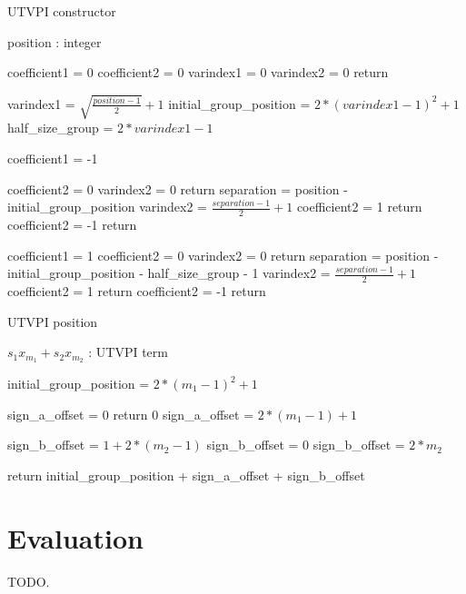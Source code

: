 \begin{algorithm}
  \caption{UTVPI constructor}
  \linespread{\separationline}\selectfont
  \begin{algorithmic}[2]
     {position : integer}

    \State coefficient1 = 0
    \State coefficient2 = 0
    \State varindex1 = 0
    \State varindex2 = 0
    \State return
    \EndIf

    \State varindex1 = $\sqrt{\frac{position - 1}{2}} + 1$
    \State initial\_group\_position = $2*(varindex1-1)^2 + 1$
    \State half\_size\_group = $2*varindex1-1$

    \State coefficient1 = -1

    \State coefficient2 = 0
    \State varindex2 = 0
    \State return
    \EndIf
    \State separation = position - initial\_group\_position
    \State varindex2 = $\frac{separation - 1}{2} + 1$
    \State coefficient2 = 1
    \State return
    \EndIf
    \State coefficient2 = -1
    \State return
    \EndIf

    \State coefficient1 = 1
    \State coefficient2 = 0
    \State varindex2 = 0
    \State return
    \EndIf
    \State separation = position - initial\_group\_position - half\_size\_group - 1
    \State varindex2 = $\frac{separation - 1}{2} + 1$
    \State coefficient2 = 1
    \State return
    \EndIf
    \State coefficient2 = -1
    \State return
    \EndProcedure
  \end{algorithmic}
\end{algorithm}

\begin{algorithm}
  \caption{UTVPI position}
  \linespread{\separationline}\selectfont
  \begin{algorithmic}[2]
     { $s_1 x_{m_1} + s_2 x_{m_2}$ : UTVPI term}

    \State initial\_group\_position = $2*(m_1 -1)^2 + 1$

    \State sign\_a\_offset = 0
    \Else
    \State return 0
    \Else
    \State sign\_a\_offset = $2*(m_1 - 1) + 1$
    \EndIf
    \EndIf
    \EndIf

    \State sign\_b\_offset = $1 + 2*(m_2 -1)$
    \Else
    \State sign\_b\_offset = 0
    \Else
    \State sign\_b\_offset = $2*m_2$
    \EndIf
    \EndIf
    \EndIf

    \State return initial\_group\_position + sign\_a\_offset + sign\_b\_offset

    \EndProcedure
  \end{algorithmic}

\end{algorithm}


\section{Evaluation}

TODO.

